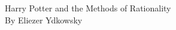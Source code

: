 \cleardoublepage
\begin{center}
Harry Potter and the Methods of Rationality\\
By Eliezer Ydkowsky
\end{center}
\clearpage